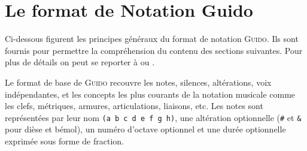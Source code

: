 \documentclass{article}
\newcommand{\guido}			{\textsc{Guido}}
\newcommand{\code}[1]		{{\small \texttt{#1}}}
\begin{document}


\section{Le format de Notation Guido}\label{sec:format_notation}

Ci-dessous figurent les principes généraux du format de notation \guido{}. Ils sont fournis pour permettre la compréhension du contenu des sections suivantes. Pour plus de détails on peut se reporter à \cite{Dau09a} ou \cite{guido}.

Le format de base de \guido{} recouvre les notes, silences, altérations, voix indépendantes, et les concepts les plus courants de la notation musicale comme les clefs, métriques, armures, articulations, liaisons, etc.
Les notes sont représentées par leur nom \code{(a b c d e f g h)}, une altération optionnelle (\code{\#} et \code{\&} pour dièse et bémol), un numéro d'octave optionnel et une durée optionnelle exprimée sous forme de fraction.

\end{document}
